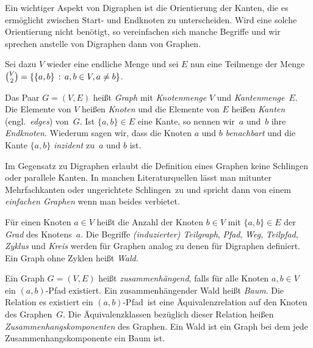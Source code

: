 \begin{bem}
Ein wichtiger Aspekt von Digraphen ist die Orientierung der Kanten, die es ermöglicht zwischen Start- und Endknoten zu unterscheiden.
Wird eine solche Orientierung nicht benötigt, so vereinfachen sich manche Begriffe und wir sprechen anstelle von Digraphen dann von Graphen.
\end{bem} 

\begin{defn} 
Sei dazu $V$ wieder eine endliche Menge und sei $E$ nun eine Teilmenge der Menge $\binom{V}{2}= \left\{ \{a,b\} \,:\, a, b \in V, a \ne b \right\} $. 

Das Paar $G=(V,E)$ heißt \emph{Graph} mit \emph{Knotenmenge} $V$ und \emph{Kantenmenge}~$E$.
Die Elemente von $V$ heißen \emph{Knoten} und die Elemente von $E$ heißen \emph{Kanten} (engl.~\emph{edges}) von~$G$.
Ist $\{a,b\} \in E$ eine Kante, so nennen wir~$a$ und~$b$ ihre \emph{Endknoten}.
Wiederum sagen wir, dass die Knoten $a$ und $b$ \emph{benachbart} und die Kante $\{a,b\}$ \emph{inzident} zu~$a$ und $b$ ist.
\end{defn} 

\begin{bem}
Im Gegensatz zu Digraphen erlaubt die Definition eines Graphen keine Schlingen oder parallele Kanten.
In manchen Literaturquellen lässt man mitunter Mehrfachkanten oder \glqq ungerichtete Schlingen\grqq\ zu und spricht dann von einem \emph{einfachen Graphen} wenn man beides verbietet.
\end{bem}

\begin{defn} 
Für einen Knoten $a \in V$ heißt die Anzahl der Knoten $b \in V$ mit $\{a,b\} \in E$ der \emph{Grad} des Knotens~$a$.
Die Begriffe \emph{(induzierter) Teilgraph}, \emph{Pfad}, \emph{Weg}, \emph{Teilpfad}, \emph{Zyklus} und \emph{Kreis} werden für Graphen analog zu denen für Digraphen definiert.
Ein Graph ohne Zyklen heißt \emph{Wald}.
\end{defn}

\begin{defn} 
Ein Graph $G=(V,E)$ heißt \emph{zusammenhängend}, falls für alle Knoten $a, b \in V$ ein $(a,b)$-Pfad existiert.
Ein zusammenhängender Wald heißt \emph{Baum}.
Die Relation \glqq es existiert ein $(a,b)$-Pfad\grqq\ ist eine Äquivalenzrelation auf den Knoten des Graphen~$G$.
Die Äquivalenzklassen bezüglich dieser Relation heißen \emph{Zusammenhangskomponenten} des Graphen.
Ein Wald ist ein Graph bei dem jede Zusammenhangskomponente ein Baum ist.
\end{defn} 


